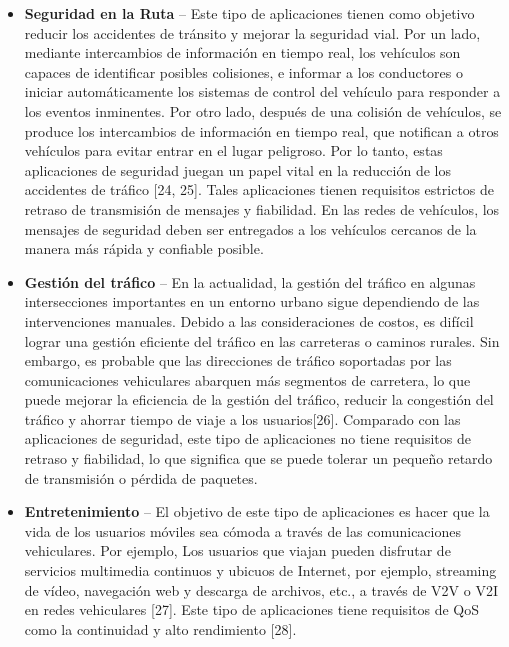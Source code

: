 \begin{itemize}
    \item{\textbf{Seguridad en la Ruta}} -- Este tipo de aplicaciones tienen como objetivo reducir los accidentes de tránsito y mejorar la seguridad vial. Por un lado, mediante intercambios de información en tiempo real, los vehículos son capaces de identificar posibles colisiones, e informar a los conductores o iniciar automáticamente los sistemas de control del vehículo para responder a los eventos inminentes. Por otro lado, después de una colisión de vehículos, se produce los intercambios de información en tiempo real, que notifican a otros vehículos para evitar entrar en el lugar peligroso. Por lo tanto, estas aplicaciones de seguridad juegan un papel vital en la reducción de los accidentes de tráfico [24, 25]. Tales aplicaciones tienen requisitos estrictos de retraso de transmisión de mensajes y fiabilidad. En las redes de vehículos, los mensajes de seguridad deben ser entregados a los vehículos cercanos de la manera más rápida y confiable posible.
    
    \item{\textbf{Gestión del tráfico}} -- En la actualidad, la gestión del tráfico en algunas intersecciones importantes en un entorno urbano sigue dependiendo de las intervenciones manuales. Debido a las consideraciones de costos, es difícil lograr una gestión eficiente del tráfico en las carreteras o caminos rurales. Sin embargo, es probable que las direcciones de tráfico soportadas por las comunicaciones vehiculares abarquen más segmentos de carretera, lo que puede mejorar la eficiencia de la gestión del tráfico, reducir la congestión del tráfico y ahorrar tiempo de viaje a los usuarios[26]. Comparado con las aplicaciones de seguridad, este tipo de aplicaciones no tiene requisitos de retraso y fiabilidad, lo que significa que se puede tolerar un pequeño retardo de transmisión o pérdida de paquetes.
    
    \item{\textbf{Entretenimiento}} -- El objetivo de este tipo de aplicaciones es hacer que la vida de los usuarios móviles sea cómoda a través de las comunicaciones vehiculares. Por ejemplo, Los usuarios que viajan pueden disfrutar de servicios multimedia continuos y ubicuos de Internet, por ejemplo, streaming de vídeo, navegación web y descarga de archivos, etc., a través de V2V o V2I en redes vehiculares [27]. Este tipo de aplicaciones tiene requisitos de QoS como la continuidad y alto rendimiento [28].
\end{itemize}


